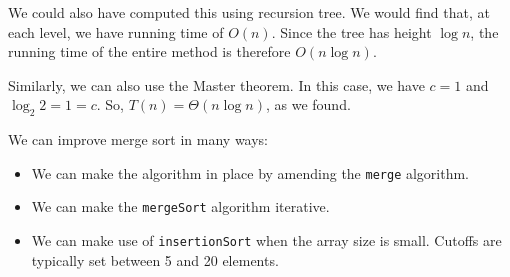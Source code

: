 \documentclass[a4paper, openany]{memoir}
\begin{document}
\noindent We could also have computed this using recursion tree. We would find that, at each level, we have running time of $O(n)$. Since the tree has height $\log n$, the running time of the entire method is therefore $O(n \log n)$.

\noindent Similarly, we can also use the Master theorem. In this case, we have $c = 1$ and $\log_2 2 = 1 = c$. So, $T(n) = \Theta(n \log n)$, as we found.

\noindent We can improve merge sort in many ways:
\begin{itemize}
    \item We can make the algorithm in place by amending the \texttt{merge} algorithm.
    \item We can make the \texttt{mergeSort} algorithm iterative.
    \item We can make use of \texttt{insertionSort} when the array size is small. Cutoffs are typically set between 5 and 20 elements.
\end{itemize}
\end{document}
